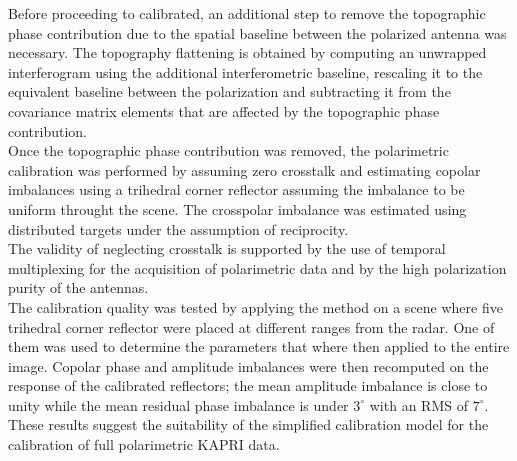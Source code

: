 Before proceeding to calibrated, an additional step to remove the topographic phase contribution due to the spatial baseline between the polarized antenna was necessary. The topography flattening is obtained by computing an unwrapped  interferogram using the additional interferometric baseline, rescaling it to the equivalent baseline between the polarization and subtracting it from the covariance matrix elements that are affected by the topographic phase contribution.\\ Once the topographic phase contribution was removed, the polarimetric calibration was performed by assuming zero crosstalk and estimating copolar imbalances using a trihedral corner reflector assuming the imbalance to be uniform throught the scene. The crosspolar imbalance was estimated using distributed targets under the assumption of reciprocity.\\ The validity of neglecting crosstalk is supported by the use of temporal multiplexing for the acquisition of polarimetric data and by the high polarization purity of the antennas.\\ The calibration quality was tested by applying the method on a scene where five trihedral corner reflector were placed at different ranges from the radar. One of them was used to determine the parameters that where then applied to the entire image. Copolar phase and amplitude imbalances were then recomputed on the response of the calibrated reflectors; the mean amplitude imbalance is close to unity while the mean residual phase imbalance is under $3^\circ$ with an RMS of $7^\circ$. These results suggest the suitability of the simplified calibration model for the calibration of full polarimetric KAPRI data.